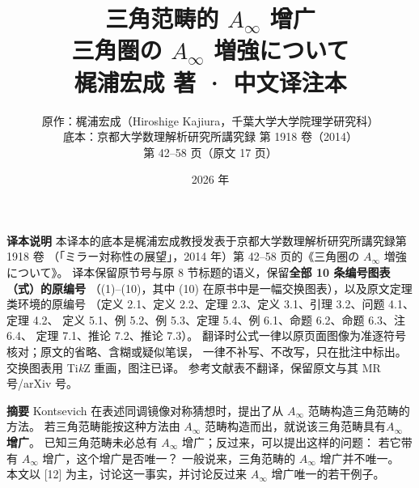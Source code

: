 

\title{\bfseries 三角范畴的 \texorpdfstring{$A_\infty$}{A∞} 增广\\[6pt]
  \large\mdseries 三角圏の \texorpdfstring{$A_\infty$}{A∞} 増強について\\[2pt]
  \large\mdseries 梶浦宏成 著 · 中文译注本}
\author{原作：梶浦宏成（Hiroshige Kajiura，千葉大学大学院理学研究科）\\[2pt]
  \small 底本：京都大学数理解析研究所講究録 第 1918 卷（2014）\\
  \small 第 42–58 页（原文 17 页）}
\date{2026 年}


\maketitle
\thispagestyle{empty}

\vspace{1em}
\begin{center}
\begin{minipage}{0.86\textwidth}
\small
\textbf{译本说明}\quad
本译本的底本是梶浦宏成教授发表于京都大学数理解析研究所講究録第 1918 卷
（「ミラー対称性の展望」，2014 年）第 42–58 页的《三角圏の $A_\infty$ 増強について》。
译本保留原节号与原 8 节标题的语义，保留\textbf{全部 10 条编号图表（式）的原编号}
（(1)–(10)，其中 (10) 在原书中是一幅交换图表），以及原文定理类环境的原编号
（定义 2.1、定义 2.2、定理 2.3、定义 3.1、引理 3.2、问题 4.1、定理 4.2、
定义 5.1、例 5.2、例 5.3、定理 5.4、例 6.1、命题 6.2、命题 6.3、注 6.4、
定理 7.1、推论 7.2、推论 7.3）。
翻译时公式一律以原页面图像为准逐符号核对；原文的省略、含糊或疑似笔误，
一律不补写、不改写，只在批注中标出。交换图表用 Ti\emph{k}Z 重画，图注已译。
参考文献表不翻译，保留原文与其 MR 号/arXiv 号。
\end{minipage}
\end{center}

\clearpage

\begin{center}
\begin{minipage}{0.88\textwidth}
\noindent\textbf{摘要}\quad
Kontsevich 在表述同调镜像对称猜想时，提出了从 $A_\infty$ 范畴构造三角范畴的方法。
若三角范畴能按这种方法由 $A_\infty$ 范畴构造而出，就说该三角范畴具有\textbf{$A_\infty$ 增广}。
已知三角范畴未必总有 $A_\infty$ 增广；反过来，可以提出这样的问题：
若它带有 $A_\infty$ 增广，这个增广是否唯一？
一般说来，三角范畴的 $A_\infty$ 增广并不唯一。
本文以 [12] 为主，讨论这一事实，并讨论反过来 $A_\infty$ 增广唯一的若干例子。
\end{minipage}
\end{center}

